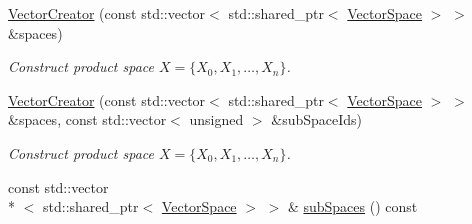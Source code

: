 \begin{DoxyCompactItemize}
\item 
\hyperlink{classSpacy_1_1ProductSpace_1_1VectorCreator_a73b6243d0ba00d019319e66bb06784dd}{Vector\-Creator} (const std\-::vector$<$ std\-::shared\-\_\-ptr$<$ \hyperlink{classSpacy_1_1VectorSpace}{Vector\-Space} $>$ $>$ \&spaces)
\begin{DoxyCompactList}\small\item\em Construct product space $ X = \{ X_0 , X_1 , \ldots , X_n \} $. \end{DoxyCompactList}\item 
\hyperlink{classSpacy_1_1ProductSpace_1_1VectorCreator_a82405d256a2689cb4984af1360cb3000}{Vector\-Creator} (const std\-::vector$<$ std\-::shared\-\_\-ptr$<$ \hyperlink{classSpacy_1_1VectorSpace}{Vector\-Space} $>$ $>$ \&spaces, const std\-::vector$<$ unsigned $>$ \&sub\-Space\-Ids)
\begin{DoxyCompactList}\small\item\em Construct product space $ X = \{ X_0 , X_1 , \ldots , X_n \} $. \end{DoxyCompactList}\item 
\hypertarget{classSpacy_1_1ProductSpace_1_1VectorCreator_aa46303313c37f29cdfe54479d85cfe87}{const std\-::vector\\*
$<$ std\-::shared\-\_\-ptr$<$ \hyperlink{classSpacy_1_1VectorSpace}{Vector\-Space} $>$ $>$ \& \hyperlink{classSpacy_1_1ProductSpace_1_1VectorCreator_aa46303313c37f29cdfe54479d85cfe87}{sub\-Spaces} () const }\label{classSpacy_1_1ProductSpace_1_1VectorCreator_aa46303313c37f29cdfe54479d85cfe87}


\end{DoxyCompactItemize}
